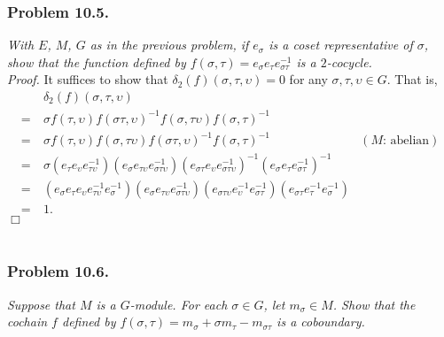 \documentclass{article}
\begin{document}



\subsubsection*{Problem 10.5.}
\emph{With $E$, $M$, $G$ as in the previous problem,
if $e_{\sigma}$ is a coset representative of $\sigma$,
show that the function defined by
$f(\sigma,\tau) = e_{\sigma}e_{\tau}e_{\sigma\tau}^{-1}$ is a $2$-cocycle.} \\



\emph{Proof.}
  It suffices to show that $\delta_2(f)(\sigma, \tau, \upsilon) = 0$
  for any $\sigma, \tau, \upsilon \in G$.
  That is,
  \begin{align*}
    & \:
    \delta_2(f)(\sigma, \tau, \upsilon) \\
    = & \: \sigma f(\tau, \upsilon)
        f(\sigma \tau, \upsilon)^{-1}
        f(\sigma, \tau \upsilon)
        f(\sigma, \tau)^{-1} \\
    = & \: \sigma f(\tau, \upsilon)
        f(\sigma, \tau \upsilon)
        f(\sigma \tau, \upsilon)^{-1}
        f(\sigma, \tau)^{-1}
      &(\text{$M$: abelian}) \\
    = & \: \sigma (e_{\tau}e_{\upsilon}e_{\tau\upsilon}^{-1})
        (e_{\sigma}e_{\tau\upsilon}e_{\sigma\tau\upsilon}^{-1})
        (e_{\sigma\tau}e_{\upsilon}e_{\sigma\tau\upsilon}^{-1})^{-1}
        (e_{\sigma}e_{\tau}e_{\sigma\tau}^{-1})^{-1} \\
    = & \: (e_{\sigma} e_{\tau}e_{\upsilon}e_{\tau\upsilon}^{-1} e_{\sigma}^{-1})
        (e_{\sigma}e_{\tau\upsilon}e_{\sigma\tau\upsilon}^{-1})
        (e_{\sigma\tau\upsilon}e_{\upsilon}^{-1}e_{\sigma\tau}^{-1})
        (e_{\sigma\tau}e_{\tau}^{-1}e_{\sigma}^{-1}) \\
    = & \: 1.
  \end{align*}
$\Box$ \\\\






\subsubsection*{Problem 10.6.}
\emph{Suppose that $M$ is a $G$-module.
For each $\sigma \in G$, let $m_{\sigma} \in M$.
Show that the cochain $f$ defined by
$f(\sigma,\tau) = m_{\sigma} + \sigma m_{\tau} - m_{\sigma\tau}$ is a coboundary.} \\
\end{document}
